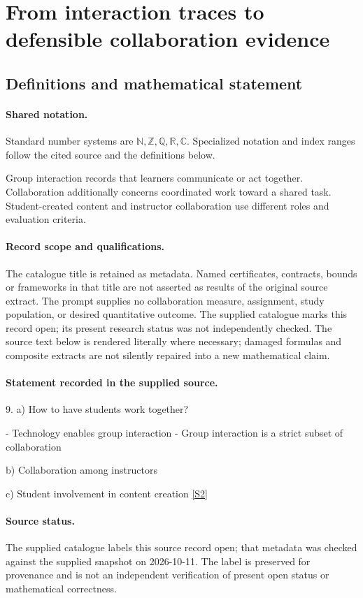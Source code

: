 \documentclass[11pt]{article}
\newcommand{\sref}[2]{\hyperlink{source:#1:#2}{[S#2]}}
\begin{document}
\section{From interaction traces to defensible collaboration evidence}\label{statement}

\subsection{Definitions and mathematical statement}

\paragraph{Shared notation.}Standard number systems are $\mathbb N,\mathbb Z,\mathbb Q,\mathbb R,\mathbb C$. Specialized notation and index ranges follow the cited source and the definitions below.


Group interaction records that learners communicate or act together. Collaboration additionally concerns coordinated work toward a shared task. Student-created content and instructor collaboration use different roles and evaluation criteria.
\paragraph{Record scope and qualifications.}
The catalogue title is retained as metadata. Named certificates, contracts, bounds or frameworks in that title are not asserted as results of the original source extract.
The prompt supplies no collaboration measure, assignment, study population, or desired quantitative outcome. The supplied catalogue marks this record open; its present research status was not independently checked.
The source text below is rendered literally where necessary; damaged formulas and composite extracts are not silently repaired into a new mathematical claim.
\paragraph{Statement recorded in the supplied source.}
9. a) How to have students work together?

- Technology enables group interaction - Group interaction is a strict subset of collaboration

b) Collaboration among instructors

c) Student involvement in content creation \sref{statement}{2}
\paragraph{Source status.}
The supplied catalogue labels this source record open; that metadata was checked against the supplied snapshot on 2026-10-11. The label is preserved for provenance and is not an independent verification of present open status or mathematical correctness.
\end{document}
